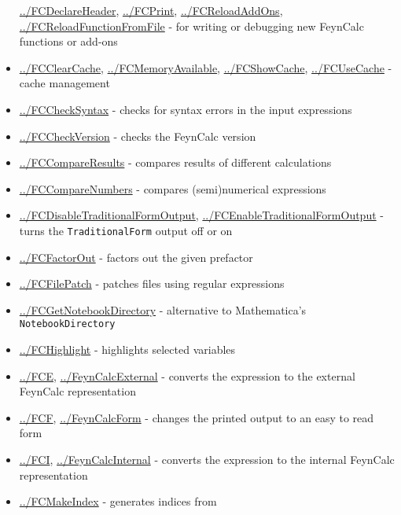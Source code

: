\documentclass[../FeynCalcManual.tex]{subfiles}
\begin{document}
\begin{itemize}
  \hyperlink{../fcdeclareheader}{../FCDeclareHeader},
  \hyperlink{../fcprint}{../FCPrint},
  \hyperlink{../fcreloadaddons}{../FCReloadAddOns},
  \hyperlink{../fcreloadfunctionfromfile}{../FCReloadFunctionFromFile} -
  for writing or debugging new FeynCalc functions or add-ons
\item
  \hyperlink{../fcclearcache}{../FCClearCache},
  \hyperlink{../fcmemoryavailable}{../FCMemoryAvailable},
  \hyperlink{../fcshowcache}{../FCShowCache},
  \hyperlink{../fcusecache}{../FCUseCache} - cache management
\item
  \hyperlink{../fcchecksyntax}{../FCCheckSyntax} - checks for syntax
  errors in the input expressions
\item
  \hyperlink{../fccheckversion}{../FCCheckVersion} - checks the FeynCalc
  version
\item
  \hyperlink{../fccompareresults}{../FCCompareResults} - compares
  results of different calculations
\item
  \hyperlink{../fccomparenumbers}{../FCCompareNumbers} - compares
  (semi)numerical expressions
\item
  \hyperlink{../fcdisabletraditionalformoutput}{../FCDisableTraditionalFormOutput},
  \hyperlink{../fcenabletraditionalformoutput}{../FCEnableTraditionalFormOutput}
  - turns the \texttt{TraditionalForm} output off or on
\item
  \hyperlink{../fcfactorout}{../FCFactorOut} - factors out the given
  prefactor
\item
  \hyperlink{../fcfilepatch}{../FCFilePatch} - patches files using
  regular expressions
\item
  \hyperlink{../fcgetnotebookdirectory}{../FCGetNotebookDirectory} -
  alternative to Mathematica's \texttt{NotebookDirectory}
\item
  \hyperlink{../fchighlight}{../FCHighlight} - highlights selected
  variables
\item
  \hyperlink{../fce}{../FCE},
  \hyperlink{../feyncalcexternal}{../FeynCalcExternal} - converts the
  expression to the external FeynCalc representation
\item
  \hyperlink{../fcf}{../FCF},
  \hyperlink{../feyncalcform}{../FeynCalcForm} - changes the printed
  output to an easy to read form
\item
  \hyperlink{../fci}{../FCI},
  \hyperlink{../feyncalcinternal}{../FeynCalcInternal} - converts the
  expression to the internal FeynCalc representation
\item
  \hyperlink{../fcmakeindex}{../FCMakeIndex} - generates indices from

\end{itemize}
\end{document}
